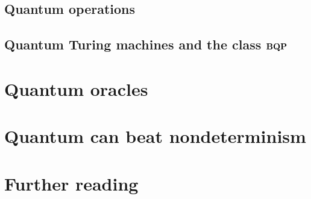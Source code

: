 \documentclass[12pt]{article}
\begin{document}
\subsection{Quantum operations}

\subsection{Quantum Turing machines and the class $\mathbf{BQP}$}



\section{Quantum oracles}


\section{Quantum can beat nondeterminism \cite{BB92}}


\section{Further reading}


\nocite{*}


\end{document}
